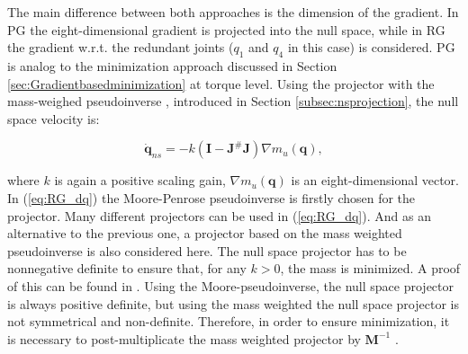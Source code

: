 The main difference between both approaches is the dimension of the gradient.  In PG the eight-dimensional gradient is projected into the null space, while in RG the gradient w.r.t. the redundant joints ($q_1$ and $q_4$ in this case) is considered.
PG is analog to the minimization approach discussed in Section \ref{sec:Gradientbasedminimization} at torque level. Using the projector  with the mass-weighed pseudoinverse \cite{khatib1995}, introduced in Section \ref{subsec:nsprojection}, the null space velocity is:


\begin{equation}
\mathbf{\dot{q}}_{ns} =  - k (\mathbf{I} -  \mathbf{J}^{\#} \mathbf{J} ) \nabla m_u(\mathbf{q}), \label{eq:RG_dq}
\end{equation}

where  $k$ is again a positive scaling gain,  $\nabla m_u(\mathbf{q})$ is an eight-dimensional vector.\\
%
%
%
%
%
In (\ref{eq:RG_dq}) the Moore-Penrose pseudoinverse is firstly chosen for the projector. 
Many different projectors can be used in (\ref{eq:RG_dq}). And as an alternative to the previous one, a projector based on the mass weighted pseudoinverse is also considered here. The null space projector has to be nonnegative definite to ensure that, for any $k > 0$, the mass is minimized. A proof of this can be found in \cite{yoshikawa}. Using the Moore-pseudoinverse, the null space projector is always positive definite, but using the mass weighted the null space projector is not symmetrical and non-definite. Therefore, in order to ensure minimization, it is necessary to post-multiplicate the mass weighted projector by $\mathbf{M}^{-1}$  \cite{Nemec}.  \\






